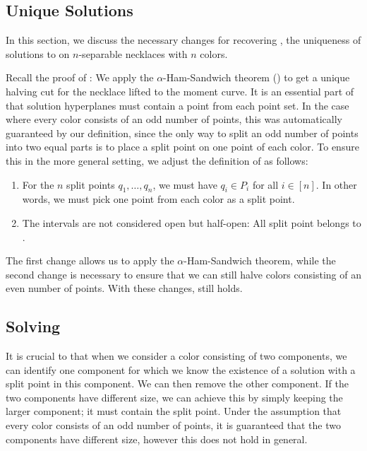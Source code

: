 \documentclass[a4paper,UKenglish,cleveref, thm-restate]{lipics-v2021}
\begin{document}
\subsection{Unique Solutions}
In this section, we discuss the necessary changes for recovering , the uniqueness of solutions to \TwoThiefNecklaceSplitting on $n$-separable necklaces with $n$ colors.

Recall the proof of : We apply the $\alpha$-Ham-Sandwich theorem () to get a unique halving cut for the necklace lifted to the moment curve. It is an essential part of  that solution hyperplanes must contain a point from each point set. In the case where every color consists of an odd number of points, this was automatically guaranteed by our definition, since the only way to split an odd number of points into two equal parts is to place a split point on one point of each color. To ensure this in the more general setting, we adjust the definition of \TwoThiefNecklaceSplitting as follows:
\begin{enumerate}
\item For the $n$ split points $q_1,\ldots,q_n$, we must have $q_i\in P_i$ for all $i\in [n]$. In other words, we must pick one point from each color as a split point. %
\item The intervals are not considered open but half-open: All split point belongs to \thiefA.
\end{enumerate}
The first change allows us to apply the $\alpha$-Ham-Sandwich theorem, while the second change is necessary to ensure that we can still halve colors consisting of an even number of points.
With these changes,  still holds.



\subsection{Solving \TwoThiefNecklaceSplitting}
It is crucial to  that when we consider a color consisting of two components, we can identify one component for which we know the existence of a solution with a split point in this component. We can then remove the other component. If the two components have different size, we can achieve this by simply keeping the larger component; it must contain the split point. Under the assumption that every color consists of an odd number of points, it is guaranteed that the two components have different size, however this does not hold in general.
\end{document}

